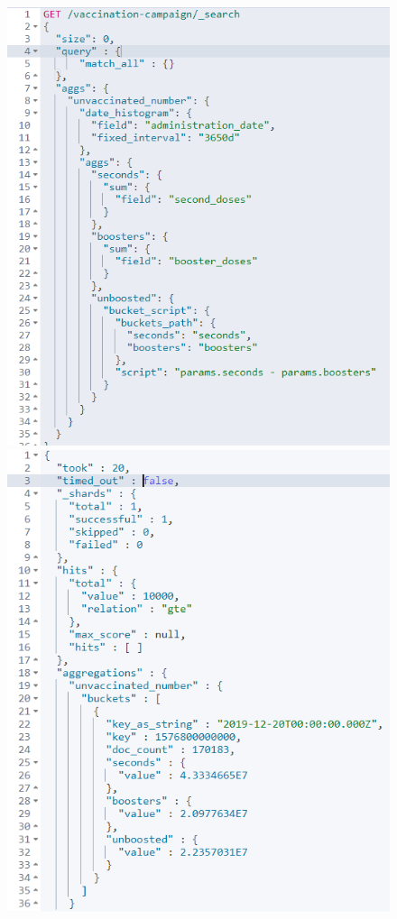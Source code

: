 \documentclass{article}[IEEEtran]
\begin{document}
\begin{figure}[H]
\begin{center}
\begin{minipage}[b]{0.4\textwidth}
    \includegraphics[width=\textwidth, frame]{Query_8.PNG}
    \subcaption{}
  \end{minipage}
  \hfill
  \begin{minipage}[b]{0.4\textwidth}
    \includegraphics[width=\textwidth, frame]{Answer_Query_8.PNG}

\end{minipage}
\end{center}
\end{figure}
\end{document}
